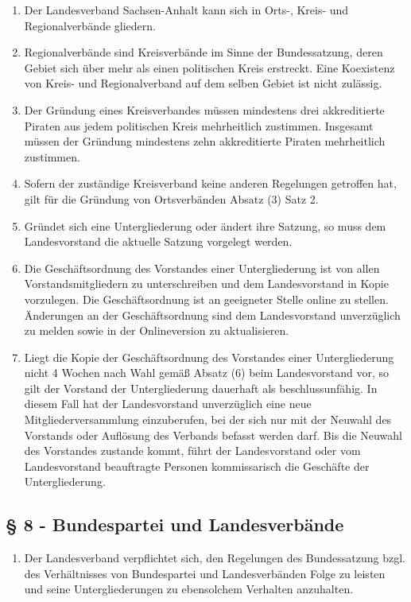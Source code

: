 \documentclass[draft,a4paper,10pt]{article}
\begin{document}
\begin{enumerate}
\item Der Landesverband Sachsen-Anhalt kann sich in Orts-, Kreis- und
Regionalverbände gliedern.

\item Regionalverbände sind Kreisverbände im Sinne der Bundessatzung, deren
Gebiet sich über mehr als einen politischen Kreis erstreckt. Eine Koexistenz von
Kreis- und Regionalverband auf dem selben Gebiet ist nicht zulässig.

\item Der Gründung eines Kreisverbandes müssen mindestens drei akkreditierte
Piraten aus jedem politischen Kreis mehrheitlich zustimmen. Insgesamt müssen der
Gründung mindestens zehn akkreditierte Piraten mehrheitlich zustimmen.

\item Sofern der zuständige Kreisverband keine anderen Regelungen getroffen hat,
gilt für die Gründung von Ortsverbänden Absatz (3) Satz 2.

\item Gründet sich eine Untergliederung oder ändert ihre Satzung, so muss dem
Landesvorstand die aktuelle Satzung vorgelegt werden.

\item Die Geschäftsordnung des Vorstandes einer Untergliederung ist von allen
Vorstandsmitgliedern zu unterschreiben und dem Landesvorstand in Kopie
vorzulegen. Die Geschäftsordnung ist an geeigneter Stelle online zu stellen.
Änderungen an der Geschäftsordnung sind dem Landesvorstand unverzüglich zu
melden sowie in der Onlineversion zu aktualisieren.

\item Liegt die Kopie der Geschäftsordnung des Vorstandes einer Untergliederung
nicht 4 Wochen nach Wahl gemäß Absatz (6) beim Landesvorstand vor, so gilt der
Vorstand der Untergliederung dauerhaft als beschlussunfähig. In diesem Fall hat
der Landesvorstand unverzüglich eine neue Mitgliederversammlung einzuberufen,
bei der sich nur mit der Neuwahl des Vorstands oder Auflösung des Verbands
befasst werden darf. Bis die Neuwahl des Vorstandes zustande kommt, führt der
Landesvorstand oder vom Landesvorstand beauftragte Personen kommissarisch die
Geschäfte der Untergliederung.
\end{enumerate}

\subsection{§ 8 - Bundespartei und Landesverbände}
\begin{enumerate}
\item Der Landesverband verpflichtet sich, den Regelungen des Bundessatzung
bzgl. des Verhältnisses von Bundespartei und Landesverbänden Folge zu leisten
und seine Untergliederungen zu ebensolchem Verhalten anzuhalten.
\end{enumerate}
\end{document}
